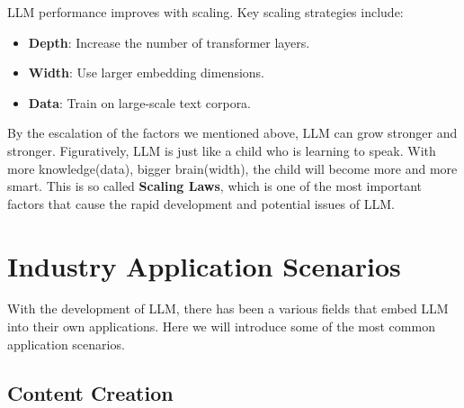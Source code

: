 \documentclass[fleqn,10pt]{SelfArx} %
\begin{document}
LLM performance improves with scaling. Key scaling strategies include:
\begin{itemize}
    \item \textbf{Depth}: Increase the number of transformer layers.
    \item \textbf{Width}: Use larger embedding dimensions.
    \item \textbf{Data}: Train on large-scale text corpora.
\end{itemize}

By the escalation of the factors we mentioned above, LLM can grow stronger and stronger. Figuratively, LLM is just like a child who is learning to speak. With more knowledge(data), bigger brain(width), the child will become more and more smart. This is so called \textbf{Scaling Laws}, which is one of the most important factors that cause the rapid development and potential issues of LLM.









\section{Industry Application Scenarios}

With the development of LLM, there has been a various fields that embed LLM into their own applications. Here we will introduce some of the most common application scenarios.

\subsection{Content Creation}
\end{document}
